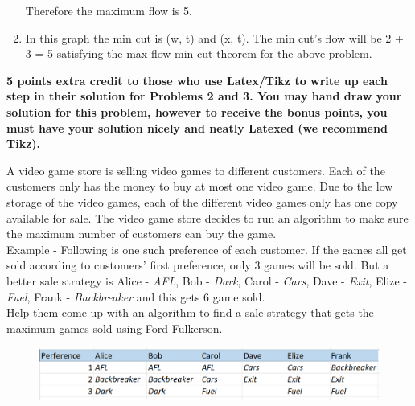 \documentclass[9pt]{article}
\begin{document}
\begin{enumerate}
\begin{center}
		\end{center}

		Therefore the maximum flow is 5.
		\vspace{5mm}

		\item In this graph the min cut is (w, t) and (x, t). The min cut’s flow will be 2 + 3 = 5 satisfying the max flow-min cut theorem for the above problem.
	\end{enumerate}

\fi

\newpage



\vspace{5mm}

\item  \textbf{5 points extra credit to those who use Latex/Tikz to write up each step in their solution for Problems 2 and 3. You may hand draw your solution for this problem, however to receive the bonus points, you must have your solution nicely and neatly Latexed (we recommend Tikz).}

A video game store is selling video games to different customers. Each of the customers only has the money to buy at most one video game. Due to the low storage of the video games, each of the different video games only has one copy available for sale. The video game store decides to run an algorithm to make sure the maximum number of customers can buy the game. \\
Example - Following is one such preference of each customer. If the games all get sold according to customers' first preference, only 3 games will be sold. But a better sale strategy is Alice - {\it AFL}, Bob - {\it Dark}, Carol - {\it Cars}, Dave - {\it Exit}, Elize - {\it Fuel}, Frank - {\it Backbreaker} and this gets 6 game sold. \\

Help them come up with an algorithm to find a sale strategy that gets the maximum games sold using Ford-Fulkerson.
\begin{figure}[h!]
\begin{center}
\includegraphics[scale=0.5]{Game.png}
\end{center}
\end{figure}
\end{document}
